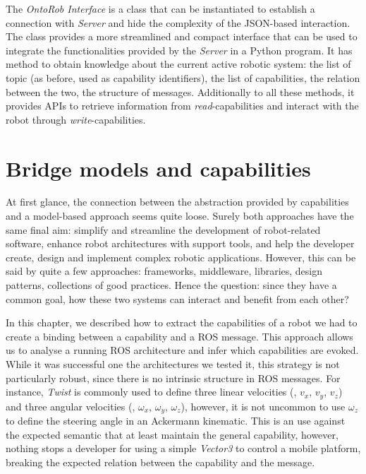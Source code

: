 The \textit{OntoRob Interface} is a class that can be instantiated to establish a connection with \textit{Server} and hide the complexity of the JSON-based interaction. The class provides a more streamlined and compact interface that can be used to integrate the functionalities provided by the \textit{Server} in a Python program. It has method to obtain knowledge about the current active robotic system: the list of topic (as before, used as capability identifiers), the list of capabilities, the relation between the two, the structure of messages. Additionally to all these methods, it provides APIs to retrieve information from \textit{read}-capabilities and interact with the robot through \textit{write}-capabilities.

\section{Bridge models and capabilities}
At first glance, the connection between the abstraction provided by capabilities and a model-based approach seems quite loose. Surely both approaches have the same final aim: simplify and streamline the development of robot-related software, enhance robot architectures with support tools, and help the developer create, design and implement complex robotic applications. However, this can be said by quite a few approaches: frameworks, middleware, libraries, design patterns, collections of good practices. Hence the question: since they have a common goal, how these two systems can interact and benefit from each other?

In this chapter, we described how to extract the capabilities of a robot we had to create a binding between a capability and a ROS message. This approach allows us to analyse a running ROS architecture and infer which capabilities are evoked. While it was successful one the architectures we tested it, this strategy is not particularly robust, since there is no intrinsic structure in ROS messages. For instance, \textit{Twist} is commonly used to define three linear velocities (\ie, $v_x$, $v_y$, $v_z$) and three angular velocities (\ie, $\omega_x$, $\omega_y$, $\omega_z$), however, it is not uncommon to use $\omega_z$ to define the steering angle in an Ackermann kinematic. This is an use against the expected semantic that at least maintain the general capability, however, nothing stops a developer for using a simple \textit{Vector3} to control a mobile platform, breaking the expected relation between the capability and the message.

